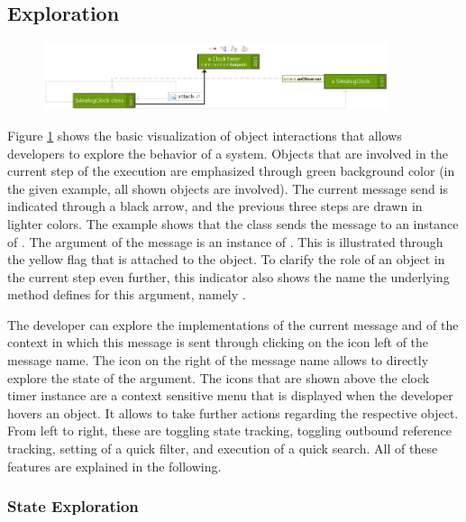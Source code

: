 \subsection{Exploration}

\begin{figure}[tb]
	\centering
	\includegraphics[width=0.9\textwidth]{../images/04-ImplExploration1}
	\caption[Foo]{}
	\label{fig:ImplementationExplorationBasic}
\end{figure}

Figure \ref{fig:ImplementationExplorationBasic} shows the basic visualization of object interactions that allows developers to explore the behavior of a system.
Objects that are involved in the current step of the execution are emphasized through green background color (in the given example, all shown objects are involved).
The current message send is indicated through a black arrow, and the previous three steps are drawn in lighter colors.
The example shows that the class  sends the  message to an instance of .
The argument of the  message is an instance of .
This is illustrated through the yellow flag that is attached to the object.
To clarify the role of an object in the current step even further, this indicator also shows the name the underlying method defines for this argument, namely .

The developer can explore the implementations of the current message and of the context in which this message is sent through clicking on the icon left of the message name.
The icon on the right of the message name allows to directly explore the state of the argument.
The icons that are shown above the clock timer instance are a context sensitive menu that is displayed when the developer hovers an object.
It allows to take further actions regarding the respective object.
From left to right, these are toggling state tracking, toggling outbound reference tracking, setting of a quick filter, and execution of a quick search.
All of these features are explained in the following.

\subsubsection{State Exploration}

